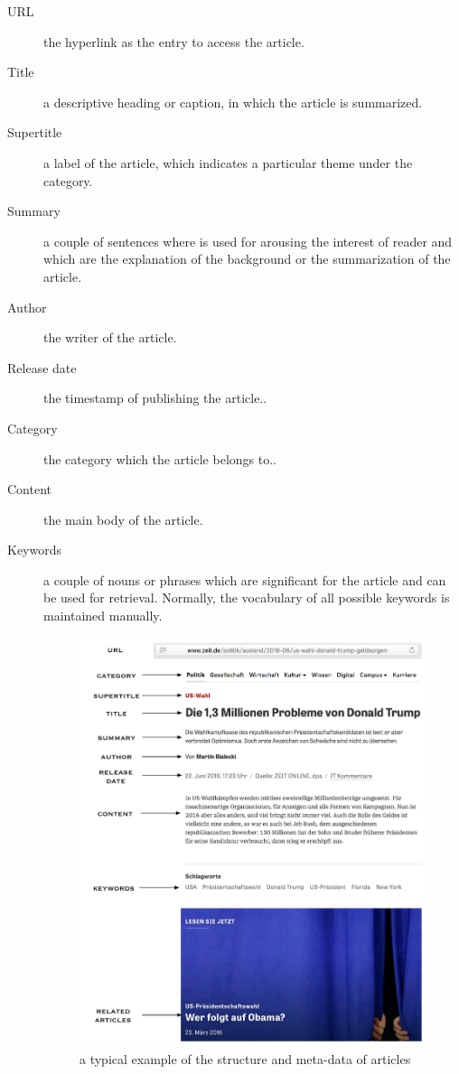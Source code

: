 \begin{description}
    \item[URL] the hyperlink as the entry to access the article.

    \item[Title] a descriptive heading or caption, in which the article is summarized.
    \item[Supertitle] a label of the article, which indicates a particular theme under the category.
    \item[Summary] a couple of sentences where is used for arousing the interest of reader and which are the explanation of the background or the summarization of the article. 
    \item[Author] the writer of the article.
    \item[Release date] the timestamp of publishing the article..
    \item[Category] the category which the article belongs to..

    \item[Content] the main body of the article.
    
    \item[Keywords] a couple of nouns or phrases which are significant for the article and can be used for retrieval. Normally, the vocabulary of all possible keywords is maintained manually. 
    
    \begin{figure}[!htb]
    \centering
    \includegraphics[width=1\textwidth]{fig/article.pdf}
    \caption{a typical example of the structure and meta-data of articles}
    \label{fig:article_structure}
    \end{figure}
    

\end{description}
